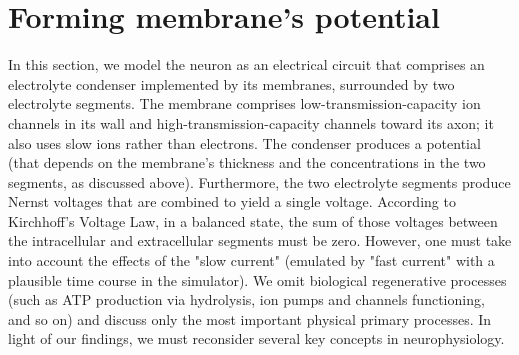 %



\ifx\magyar\undefined

\section{Forming membrane's potential\label{sec:Physics-FormingPotential}}

In this section, we model the neuron as an electrical circuit that comprises an electrolyte condenser implemented by its membranes, surrounded by two electrolyte segments. The membrane comprises low-transmission-capacity ion channels in its wall and high-transmission-capacity channels toward its axon; it also uses slow ions rather than electrons.
The condenser produces a potential (that depends on the membrane's thickness and the concentrations in the two segments, as discussed above).  Furthermore, the two electrolyte segments produce Nernst voltages that are combined to yield a single voltage. 
According to Kirchhoff's Voltage Law, in a balanced state, the sum of those voltages between the intracellular and extracellular segments must be zero.
However, one must take into account the effects of the "slow current" (emulated by 
"fast current" with a plausible time course in the simulator).
We omit biological regenerative processes (such as \gls{ATP} production via hydrolysis, ion pumps and channels functioning, and so on) and discuss only the most important physical primary processes.
In light of our findings, we must reconsider several key concepts in neurophysiology.


